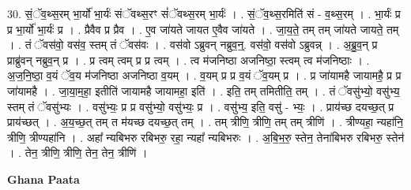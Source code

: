 \documentclass[17pt]{extarticle}
\begin{document}
30. सं॒ॅव॒थ्स॒रम् भा॒र्यो॑ भा॒र्यः॑ संॅवथ्स॒रꣳ सं॑ॅवथ्स॒रम् भा॒र्यः॑ । . सं॒ॅव॒थ्स॒रमिति॑ सं - व॒थ्स॒रम् । . भा॒र्यः॑ प्र प्र भा॒र्यो॑ भा॒र्यः॑ प्र । . प्रैवैव प्र प्रैव । . ए॒व जा॑यते जायत ए॒वैव जा॑यते । . जा॒य॒ते॒ तम् तम् जा॑यते जायते॒ तम् । . तं ॅवस॑वो॒ वस॑व॒ स्तम् तं ॅवस॑वः । . वस॑वो ऽब्रुवन् नब्रुव॒न्॒. वस॑वो॒ वस॑वो ऽब्रुवन्न् । . अ॒ब्रु॒व॒न् प्र प्राब्रु॑वन् नब्रुव॒न् प्र । . प्र त्वम् त्वम् प्र प्र त्वम् । . त्व म॑जनिष्ठा अजनिष्ठा॒ स्त्वम् त्व म॑जनिष्ठाः । . अ॒ज॒नि॒ष्ठा॒ व॒यं ॅव॒य म॑जनिष्ठा अजनिष्ठा व॒यम् । . व॒यम् प्र प्र व॒यं ॅव॒यम् प्र । . प्र जा॑यामहै जायामहै॒ प्र प्र जा॑यामहै । . जा॒या॒म॒हा॒ इतीति॑ जायामहै जायामहा॒ इति॑ । . इति॒ तम् तमितीति॒ तम् । . तं ॅवसु॑भ्यो॒ वसु॑भ्य॒ स्तम् तं ॅवसु॑भ्यः । . वसु॑भ्यः॒ प्र प्र वसु॑भ्यो॒ वसु॑भ्यः॒ प्र । . वसु॑भ्य॒ इति॒ वसु॑ - भ्यः॒ । . प्राय॑च्छ दयच्छ॒त् प्र प्राय॑च्छत् । . अ॒य॒च्छ॒त् तम् त म॑यच्छ दयच्छ॒त् तम् । . तम् त्रीणि॒ त्रीणि॒ तम् तम् त्रीणि॑ । . त्रीण्यहा॒ न्यहा॑नि॒ त्रीणि॒ त्रीण्यहा॑नि । . अहा᳚ न्यबिभरु रबिभरु॒ रहा॒ न्यहा᳚ न्यबिभरुः । . अ॒बि॒भ॒रु॒ स्तेन॒ तेना॑बिभरु रबिभरु॒ स्तेन॑ । . तेन॒ त्रीणि॒ त्रीणि॒ तेन॒ तेन॒ त्रीणि॑ । \newline

\textbf{Ghana Paata } \newline
\end{document}
